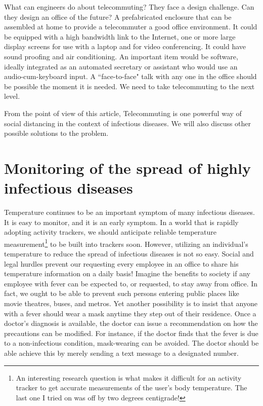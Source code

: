 \begin{multicols}{2}
What can engineers do about telecommuting? They face a design challenge. Can they design an office of the future?  A prefabricated enclosure that can be assembled at home to provide a telecommuter a good office environment. It could be equipped with a high bandwidth link to the Internet, one or more large display screens for use with a laptop and for video conferencing. It could have sound proofing and air conditioning. An important item would be software, ideally integrated as an automated secretary or assistant who would use an audio-cum-keyboard input. A ``face-to-face" talk with any one in the office should be possible the moment it is needed. We need to take telecommuting to the next level. 

From the point of view of this article, Telecommuting is one powerful way of social distancing in the context of infectious diseases. We will also discuss other possible solutions to the problem. 

\vspace{-.3cm}

\section{Monitoring of the spread of highly infectious diseases}\label{section-3}

\vspace{-.2cm}

Temperature continues to be an important symptom of many infectious diseases. It is easy to monitor, and it is an early symptom. In a world that is rapidly adopting activity trackers, we should anticipate reliable temperature measurement\footnote{An interesting research question is what makes it difficult for an activity tracker to get accurate measurements of the user’s body temperature. The last one I tried on was off by two degrees centigrade!} to be built into trackers soon. However, utilizing an individual’s temperature to reduce the spread of infectious diseases is not so easy. Social and legal hurdles prevent our requesting every employee in an office to share his temperature information on a daily basis! Imagine the benefits to society if any employee with fever can be expected to, or requested, to stay away from office. In fact, we ought to be able to prevent such persons entering public places like movie theatres, buses, and metros. Yet another possibility is to insist that anyone with a fever should wear a mask anytime they step out of their residence. Once a doctor’s diagnosis is available, the doctor can issue a recommendation on how the precautions can be modified. For instance, if the doctor finds that the fever is due to a non-infectious condition, mask-wearing can be avoided. The doctor should be able achieve this by merely sending a text message to a designated number.


\end{multicols}
